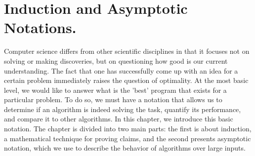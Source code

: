 
\newcommand*{\RECITATION}{}%

\section{Induction and Asymptotic Notations.}
Computer science differs from other scientific disciplines in that it focuses not on solving or making discoveries, but on questioning how good is our current understanding. The fact that one has successfully come up with an idea for a certain problem immediately raises the question of optimality. At the most basic level, we would like to answer what is the 'best'  program that exists for a particular problem. To do so, we must have a notation that allows us to determine if an algorithm is indeed solving the task, quantify its performance, and compare it to other algorithms. In this chapter, we introduce this basic notation. The chapter is divided into two main parts: the first is about induction, a mathematical technique for proving claims, and the second presents asymptotic notation, which we use to describe the behavior of algorithms over large inputs.
 

